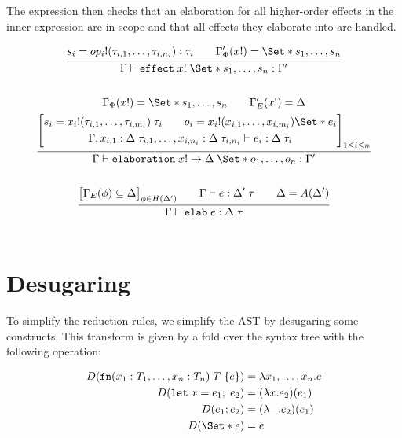 The  expression then checks that an elaboration for all higher-order effects in the inner expression are in scope and that all effects they elaborate into are handled.
\\

\begin{gather*}
    \infer{
        \Gamma \vdash \kw{effect}\;x!\;\S{s_1, \dots, s_n}: \Gamma'
    }{
        s_i = op_i!(\tau_{i,1}, \dots, \tau_{i,n_i}): \tau_i
        \qquad
        \Gamma'_\Phi(x!) = \S{s_1, \dots, s_n}
    }
    \\\\
    \infer{
        \Gamma \vdash \elaboration\;x! \to \Delta\;\S{o_1, \dots, o_n} : \Gamma'
    }{
        \Gamma_\Phi(x!) = \S{s_1, \dots, s_n}
        \qquad
        \Gamma'_E(x!) = \Delta
        \\
        \left[
            \begin{gathered}
                s_i = x_i!(\tau_{i,1}, \dots, \tau_{i,m_i})\;\tau_i \qquad o_i = x_i!(x_{i,1}, \dots, x_{i,m_i}) \S{ e_i }
                \\
                \Gamma,x_{i,1}: \Delta\;\tau_{i,1},\dots,x_{i,n_i}: \Delta\;\tau_{i,n_i} \vdash 
                e_i : \Delta\;\tau_i
            \end{gathered}
        \right]_{1\leq i \leq n}
            }
    \\\\
    \infer{
        \Gamma \vdash \elab\;e : \Delta\;\tau
    }{
        \big[
            \Gamma_E(\phi) \subseteq \Delta
        \big]_{\phi \in H(\Delta')}
        \qquad
        \Gamma \vdash e : \Delta'\;\tau
        \qquad
        \Delta = A(\Delta')
    }
    \\\\
\end{gather*}

\section{Desugaring}
To simplify the reduction rules, we simplify the AST by desugaring some constructs. This transform is given by a fold over the syntax tree with the following operation:

\begin{align*}
    D(\fn(x_1: T_1, \dots, x_n: T_n)\;T\;\{e\}) &= \lambda x_1,\dots,x_n . e \\
    D(\kw{let}\;x = e_1;\;e_2) &= (\lambda x . e_2)(e_1)\\
    D(e_1; e_2) &= (\lambda \_ . e_2)(e_1)\\
    D(\S{e}) &= e\\
\end{align*}

